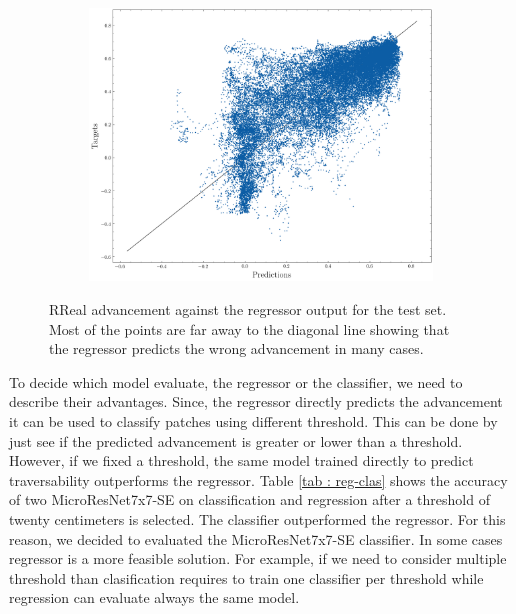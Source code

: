 \documentclass[../document.tex]{subfiles}
\begin{document}
\begin{figure}[htbp]
  \centering
  \begin{subfigure}[b]{1\linewidth}
    \includegraphics[width=\linewidth]{../img/4/regression_scatter.png} 
  \end{subfigure}
  \caption{RReal advancement against the regressor output for the test set. Most of the points are far away to the diagonal line showing that the regressor predicts the wrong advancement in many cases.}
  \label{fig : regression-preds-targs}
\end{figure}
To decide which model evaluate, the regressor or the classifier, we need to describe their advantages. Since, the regressor directly predicts the advancement it can be used to classify patches using different threshold. This can be done by just see if the predicted advancement is greater or lower than a threshold. However, if we fixed a threshold, the same model trained directly to predict traversability outperforms the regressor. Table \ref{tab : reg-clas} shows the accuracy of two MicroResNet7x7-SE on classification and regression after a threshold of twenty centimeters is selected. The classifier outperformed the regressor. For this reason, we decided to evaluated the MicroResNet7x7-SE classifier. In some cases regressor is a more feasible solution. For example, if we need to consider multiple threshold than clasification requires to train one classifier per threshold while regression can evaluate always the same model.
\end{document}
